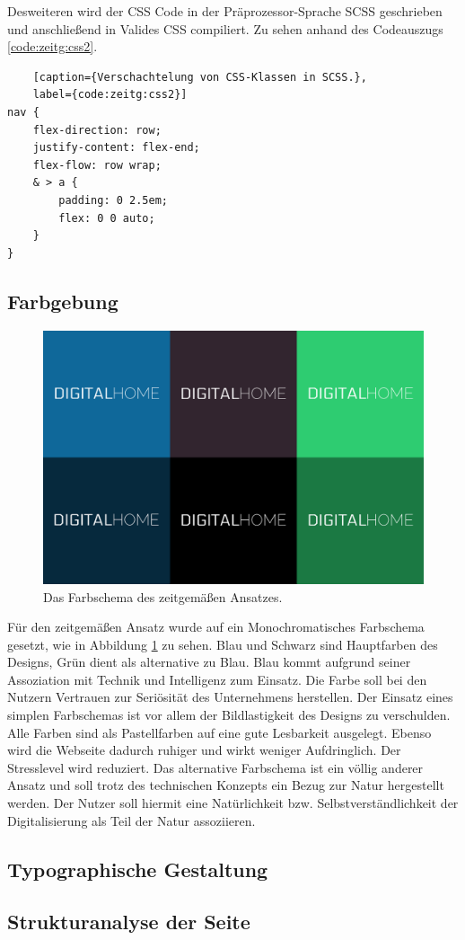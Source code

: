 Desweiteren wird der CSS Code in der Präprozessor-Sprache SCSS geschrieben und anschließend in Valides CSS compiliert. Zu sehen anhand des Codeauszugs \ref{code:zeitg:css2}.

\begin{lstlisting}
	[caption={Verschachtelung von CSS-Klassen in SCSS.},
	label={code:zeitg:css2}]
nav {
	flex-direction: row;
	justify-content: flex-end;
	flex-flow: row wrap;
	& > a {
		padding: 0 2.5em;
		flex: 0 0 auto;
	}
}
\end{lstlisting}

\subsection{Farbgebung}
\begin{figure} [hp]
	\includegraphics[width=\textwidth]{./img/zeitg_farbschema1.png}
	\caption{Das Farbschema des zeitgemäßen Ansatzes.}
	\label{zeitg:farbschema}
\end{figure}

Für den zeitgemäßen Ansatz wurde auf ein Monochromatisches Farbschema gesetzt, wie in Abbildung \ref{zeitg:farbschema} zu sehen. Blau und Schwarz sind Hauptfarben des Designs, Grün dient als alternative zu Blau.
Blau kommt aufgrund seiner Assoziation mit Technik und Intelligenz zum Einsatz. Die Farbe soll bei den Nutzern Vertrauen zur Seriösität des Unternehmens herstellen. Der Einsatz eines simplen Farbschemas ist vor allem der Bildlastigkeit des Designs zu verschulden.
Alle Farben sind als Pastellfarben auf eine gute Lesbarkeit ausgelegt. Ebenso wird die Webseite dadurch ruhiger und wirkt weniger Aufdringlich. Der Stresslevel wird reduziert.
Das alternative Farbschema ist ein völlig anderer Ansatz und soll trotz des technischen Konzepts ein Bezug zur Natur hergestellt werden. Der Nutzer soll hiermit eine Natürlichkeit bzw. Selbstverständlichkeit der Digitalisierung als Teil der Natur assoziieren.

\subsection{Typographische Gestaltung}


\subsection{Strukturanalyse der Seite}\label{zeitg:struktur}